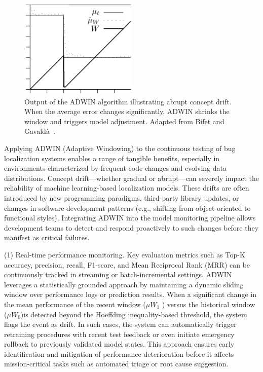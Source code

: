 \documentclass[manuscript,screen,review]{acmart}
\begin{document}
\begin{figure}[H]
  \centering
  \includegraphics[width=0.5\textwidth]{picture/5.1fig2.png}
  \caption{Output of the ADWIN algorithm illustrating abrupt concept drift. When the average error changes significantly, ADWIN shrinks the window and triggers model adjustment. Adapted from Bifet and Gavaldà~\cite{Bifet2007}.}
  \label{fig:adwin}
\end{figure}

Applying ADWIN (Adaptive Windowing) to the continuous testing of bug localization systems enables a range of tangible benefits, especially in environments characterized by frequent code changes and evolving data distributions. Concept drift—whether gradual or abrupt—can severely impact the reliability of machine learning-based localization models. These drifts are often introduced by new programming paradigms, third-party library updates, or changes in software development patterns (e.g., shifting from object-oriented to functional styles). Integrating ADWIN into the model monitoring pipeline allows development teams to detect and respond proactively to such changes before they manifest as critical failures.

(1) Real-time performance monitoring.
Key evaluation metrics such as Top-K accuracy, precision, recall, F1-score, and Mean Reciprocal Rank (MRR) can be continuously tracked in streaming or batch-incremental settings. ADWIN leverages a statistically grounded approach by maintaining a dynamic sliding window over performance logs or prediction results. When a significant change in the mean performance of the recent window (\( \mu\)\( W_1 \) ) versus the historical window (\( \mu\)\( W_0 \))is detected beyond the Hoeffding inequality-based threshold, the system flags the event as drift. In such cases, the system can automatically trigger retraining procedures with recent test feedback or even initiate emergency rollback to previously validated model states. This approach ensures early identification and mitigation of performance deterioration before it affects mission-critical tasks such as automated triage or root cause suggestion.
\end{document}
